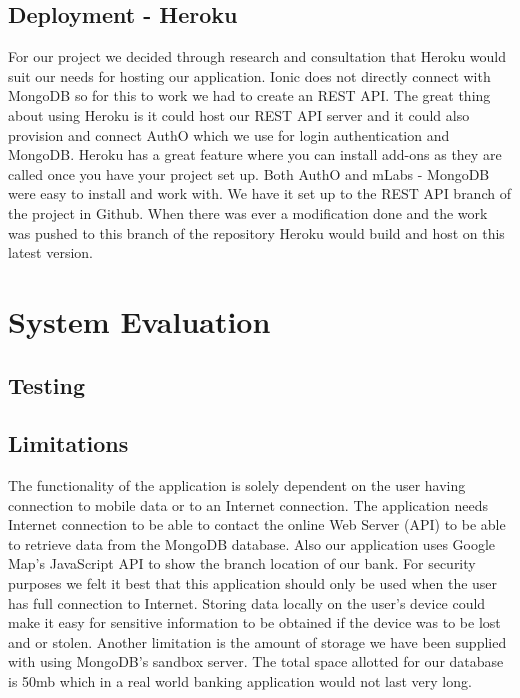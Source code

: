 \paragraph{}
\section{Deployment - Heroku}
For our project we decided through research and consultation that Heroku would suit our needs for hosting our application. Ionic does not directly connect with MongoDB so for this to work we had to create an REST API. The great thing about using Heroku is it could host our REST API server and it could also provision and connect AuthO which we use for login authentication and MongoDB. Heroku has a great feature where you can install add-ons as they are called once you have your project set up. Both AuthO and mLabs - MongoDB were easy to install and work with. We have it set up to the REST API branch of the project in Github. When there was ever a modification done and the work was pushed to this branch of the repository Heroku would build and host on this latest version.





\chapter{System Evaluation}
\section{Testing}

\section{Limitations}
The functionality of the application is solely dependent on the user having connection to mobile data or to an Internet connection. The application needs Internet connection to be able to contact the online Web Server (API) to be able to retrieve data from the MongoDB database. Also our application uses Google Map’s JavaScript API to show the branch location of our bank. For security purposes we felt it best that this application should only be used when the user has full connection to Internet. Storing data locally on the user's device could make it easy for sensitive information to be obtained if the device was to be lost and or stolen. Another limitation is the amount of storage we have been supplied with using MongoDB's sandbox server. The total space allotted for our database is 50mb which in a real world banking application would not last very long.

